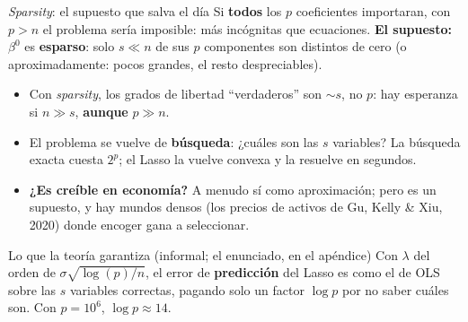 \documentclass{beamer}
\newcommand{\1}{\mathbb{I}}
\begin{document}
\begin{frame}{\emph{Sparsity}: el supuesto que salva el día}
\small
Si \textbf{todos} los $p$ coeficientes importaran, con $p > n$ el problema sería imposible: más incógnitas que ecuaciones.
\pause
\vspace{0.1cm}
\textbf{El supuesto:} $\beta^{0}$ es \textbf{esparso}: solo $s \ll n$ de sus $p$ componentes son distintos de cero (o aproximadamente: pocos grandes, el resto despreciables).
\pause
\begin{itemize}\itemsep4pt
  \item Con \emph{sparsity}, los grados de libertad ``verdaderos'' son $\sim s$, no $p$: hay esperanza si $n \gg s$, \textbf{aunque} $p \gg n$.
  \item El problema se vuelve de \textbf{búsqueda}: ¿cuáles son las $s$ variables? La búsqueda exacta cuesta $2^p$; el Lasso la vuelve convexa y la resuelve en segundos. \pause
  \item \textbf{¿Es creíble en economía?} A menudo sí como aproximación; pero es un supuesto, y hay mundos densos (los precios de activos de Gu, Kelly \& Xiu, 2020) donde encoger gana a seleccionar.
\end{itemize}
\pause
\begin{block}{Lo que la teoría garantiza (informal; el enunciado, en el apéndice)}
Con $\lambda$ del orden de $\sigma\sqrt{\log(p)/n}$, el error de \textbf{predicción} del Lasso es como el de OLS sobre las $s$ variables correctas, pagando solo un factor $\log p$ por no saber cuáles son. Con $p = 10^6$, $\log p \approx 14$.
\end{block}
\end{frame}
\end{document}
